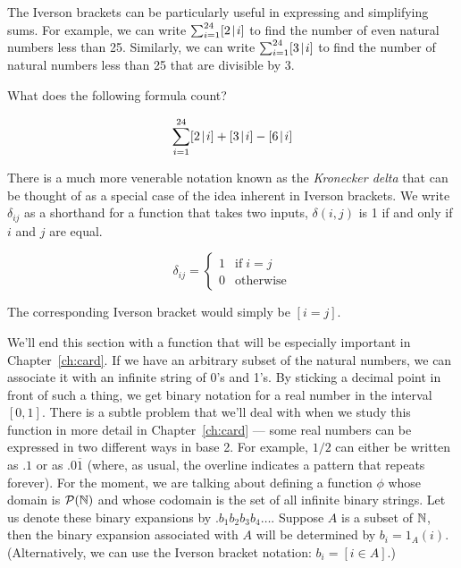 The Iverson brackets can be particularly useful in expressing and simplifying
sums.  For example, we can write $\sum_{i=1}^{24} [2 \!\mid\! i]$ to
find the number of even natural numbers less than 25.  Similarly, we can write
$\sum_{i=1}^{24} [3 \!\mid\! i]$ to find the number of natural numbers less than 
25 that are divisible by 3.  

\begin{exer}
What does the following formula count?

\[ \sum_{i=1}^{24} [2 \!\mid\! i] + [3 \!\mid\! i] - [6 \!\mid\! i] \]

\end{exer} 

There is a much more venerable notation known as the 
\emph{Kronecker delta} that can be thought of as a special case of the 
idea inherent in Iverson brackets.  We write $\delta_{ij}$ as a shorthand
for a function that takes two inputs, $\delta(i,j)$ is 1 if and only if
$i$ and $j$ are equal.

\[ \delta_{ij} =  \left\{ \begin{array}{cl} 1 & \mbox{if} \; i=j \\ 0 & \mbox{otherwise} \end{array} \right.  \]

The corresponding Iverson bracket would simply be $[i=j]$.

We'll end this section with a function that will be especially important
in Chapter~\ref{ch:card}.   If we have an arbitrary subset of the natural
numbers, we can associate it with an infinite string of 0's and 1's.  By
sticking a decimal point in front of such a thing, we get binary notation
for a real number in the interval $[0,1]$.  There is a subtle problem that 
we'll deal with when we study this function in more detail in Chapter~\ref{ch:card} --- some real numbers can be expressed in two different ways in base 2.
For example, $1/2$ can either be written as $.1$ or as $.0\overline{1}$ (where,
as usual, the overline indicates a pattern that repeats forever).  
For the moment, we are talking about 
defining a function $\phi$ whose domain is ${\mathcal P}({\mathbb N})$ and 
whose codomain is the set of all infinite binary strings. 
Let us denote these binary expansions by
$.b_1b_2b_3b_4\ldots$.  Suppose $A$ is a subset of ${\mathbb N}$,
then the binary expansion associated with $A$ will be
determined by $b_i = 1_A(i)$.  (Alternatively, we can use the Iverson 
bracket notation: $b_i = [i \in A]$.)   

